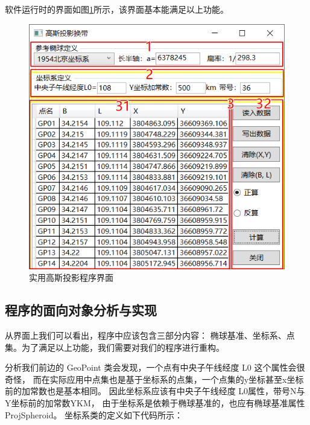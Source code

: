 软件运行时的界面如图\ref{fig:GaussProjUI02}所示，该界面基本能满足以上功能。

\begin{figure}[htbp]
    \centering
    \includegraphics[scale=1]{chapter/gaussProj/UI02.png}
    \caption{实用高斯投影程序界面}
    \label{fig:GaussProjUI02}
\end{figure}

\subsection{程序的面向对象分析与实现}

从界面上我们可以看出，程序中应该包含三部分内容：
椭球基准、坐标系、点集。为了满足以上功能，我们需要对我们的程序进行重构。

分析我们前边的 GeoPoint 类会发现，一个点有中央子午线经度 L0 这个属性会很奇怪，
而在实际应用中点集也是基于坐标系的点集，一个点集的y坐标甚至x坐标前的加常数也是基本相同。
因此坐标系应该有中央子午线经度 L0属性，带号N与Y坐标前的加常数YKM，
由于坐标系是依赖于椭球基准的，也应有椭球基准属性ProjSpheroid。
坐标系类的定义如下代码所示：

